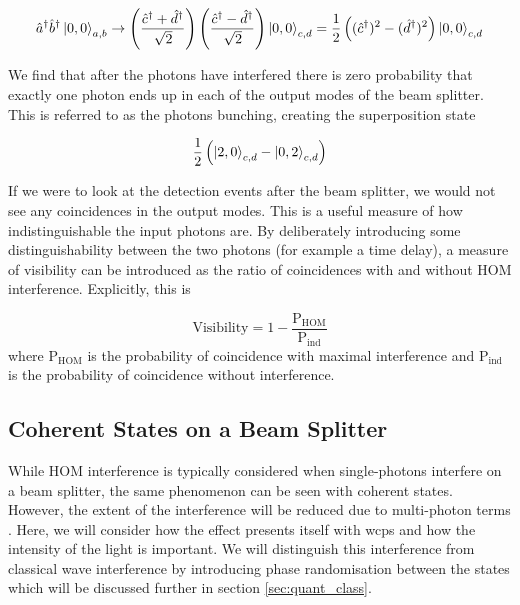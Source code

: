 \begin{equation}
	\hat{a}^\dagger \hat{b}^\dagger \ket{0,0}_{a,b} \rightarrow \left( \frac{\hat{c}^\dagger + \hat{d}^\dagger}{\sqrt{2}} \right)  \left( \frac{\hat{c}^\dagger - \hat{d}^\dagger}{\sqrt{2}} \right)  \ket{0,0}_{c,d} = \frac{1}{2}\left((\hat{c}^\dagger)^2 - (\hat{d}^\dagger)^2 \right)\ket{0,0}_{c,d}
\end{equation}

We find that after the photons have interfered there is zero probability that exactly one photon ends up in each of the output modes of the beam splitter. This is referred to as the photons bunching, creating the superposition state

\begin{equation}
	\frac{1}{2}\left(\ket{2,0}_{c,d} - \ket{0,2}_{c,d}\right)
\end{equation}

If we were to look at the detection events after the beam splitter, we would not see any coincidences in the output modes. This is a useful measure of how indistinguishable the input photons are. By deliberately introducing some distinguishability between the two photons (for example a time delay), a measure of visibility can be introduced as the ratio of coincidences with and without \ac{HOM} interference.  Explicitly, this is

\begin{equation}
	\label{eq:visibility}
	\text{Visibility} = 1 - \frac{\text{P}_\text{HOM}}{\text{P}_\text{ind}}
\end{equation}
where $\text{P}_\text{HOM}$ is the probability of coincidence with maximal interference and $\text{P}_\text{ind}$ is the probability of coincidence without interference.

\subsection{Coherent States on a Beam Splitter}

While \ac{HOM} interference is typically considered when single-photons interfere on a beam splitter, the same phenomenon can be seen with coherent states.  However, the extent of the interference will be reduced due to multi-photon terms \cite{Rarity2005}. Here, we will consider how the effect presents itself with \acp{wcp} and how the intensity of the light is important. We will distinguish this interference from classical wave interference by introducing phase randomisation between the states which will be discussed further in section \ref{sec:quant_class}.

